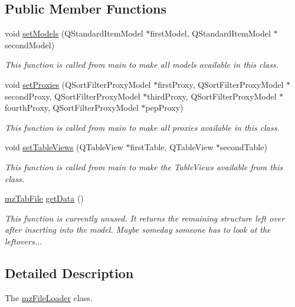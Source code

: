 \subsection*{Public Member Functions}
\begin{DoxyCompactItemize}
\item 
void \mbox{\hyperlink{classmz_file_loader_a699254cd8dabbf7fda70f02aa06730f7}{set\+Models}} (Q\+Standard\+Item\+Model $\ast$first\+Model, Q\+Standard\+Item\+Model $\ast$second\+Model)
\begin{DoxyCompactList}\small\item\em This function is called from main to make all models available in this class. \end{DoxyCompactList}\item 
void \mbox{\hyperlink{classmz_file_loader_a515cf8ce62e8c7c235a62536e739cb9d}{set\+Proxies}} (Q\+Sort\+Filter\+Proxy\+Model $\ast$first\+Proxy, Q\+Sort\+Filter\+Proxy\+Model $\ast$second\+Proxy, Q\+Sort\+Filter\+Proxy\+Model $\ast$third\+Proxy, Q\+Sort\+Filter\+Proxy\+Model $\ast$fourth\+Proxy, Q\+Sort\+Filter\+Proxy\+Model $\ast$pep\+Proxy)
\begin{DoxyCompactList}\small\item\em This function is called from main to make all proxies available in this class. \end{DoxyCompactList}\item 
void \mbox{\hyperlink{classmz_file_loader_a92066953ae94c2cf1e58a2bf4a95c021}{set\+Table\+Views}} (Q\+Table\+View $\ast$first\+Table, Q\+Table\+View $\ast$second\+Table)
\begin{DoxyCompactList}\small\item\em This function is called from main to make the Table\+Views available from this class. \end{DoxyCompactList}\item 
\mbox{\hyperlink{structmz_tab_file}{mz\+Tab\+File}} \mbox{\hyperlink{classmz_file_loader_a495d5ddac38877451d24d974c25f7f11}{get\+Data}} ()
\begin{DoxyCompactList}\small\item\em This function is currently unused. It returns the remaining structure left over after inserting into the model. Maybe someday someone has to look at the leftovers... \end{DoxyCompactList}\end{DoxyCompactItemize}


\subsection{Detailed Description}
The \mbox{\hyperlink{classmz_file_loader}{mz\+File\+Loader}} class. 

